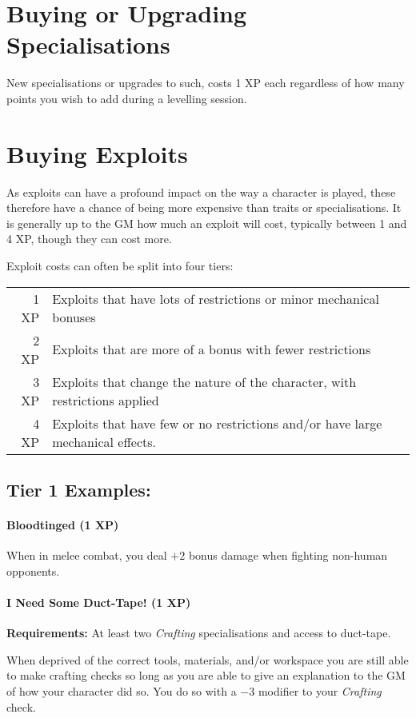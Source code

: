 \section{Buying or Upgrading Specialisations}
New specialisations or upgrades to such, costs 1 XP each regardless of how many points you wish to add during a levelling session.

\section{Buying Exploits}
As exploits can have a profound impact on the way a character is played, these therefore have a chance of being more expensive than traits or specialisations.
It is generally up to the GM how much an exploit will cost, typically between 1 and 4 XP, though they can cost more.

Exploit costs can often be split into four tiers:

\begin{tabular}{r | l}
  1 XP & Exploits that have lots of restrictions or minor mechanical bonuses\\
  2 XP & Exploits that are more of a bonus with fewer restrictions\\
  3 XP & Exploits that change the nature of the character, with restrictions applied\\
  4 XP & Exploits that have few or no restrictions and/or have large mechanical effects.
\end{tabular}

\subsection{Tier 1 Examples:}
\paragraph{Bloodtinged (1 XP)}
When in melee combat, you deal $+2$ bonus damage when fighting non-human opponents.

\paragraph{I Need Some Duct-Tape! (1 XP)}
\textbf{Requirements:} At least two \textit{Crafting} specialisations and access to duct-tape.

When deprived of the correct tools, materials, and/or workspace you are still able to make crafting checks so long as you are able to give an explanation to the GM of how your character did so.
You do so with a $-3$ modifier to your \textit{Crafting} check.

